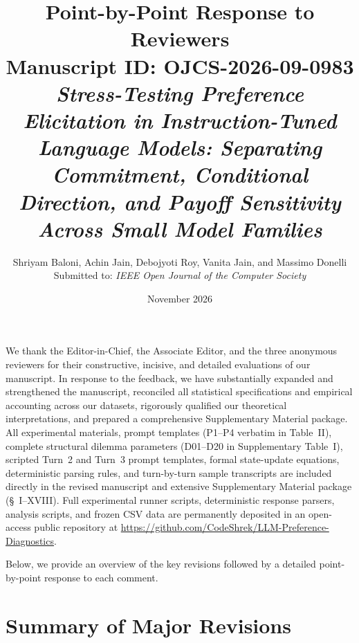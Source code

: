 \documentclass[11pt]{article}
\title{\textbf{Point-by-Point Response to Reviewers}\\
\large Manuscript ID: \textbf{OJCS-2026-09-0983}\\
\textit{Stress-Testing Preference Elicitation in Instruction-Tuned Language Models: Separating Commitment, Conditional Direction, and Payoff Sensitivity Across Small Model Families}}
\author{Shriyam Baloni, Achin Jain, Debojyoti Roy, Vanita Jain, and Massimo Donelli\\Submitted to: \textit{IEEE Open Journal of the Computer Society}}
\date{November 2026}
\begin{document}
\maketitle

\noindent We thank the Editor-in-Chief, the Associate Editor, and the three anonymous reviewers for their constructive, incisive, and detailed evaluations of our manuscript. In response to the feedback, we have substantially expanded and strengthened the manuscript, reconciled all statistical specifications and empirical accounting across our datasets, rigorously qualified our theoretical interpretations, and prepared a comprehensive Supplementary Material package. All experimental materials, prompt templates (P1--P4 verbatim in Table~II), complete structural dilemma parameters (D01--D20 in Supplementary Table~I), scripted Turn~2 and Turn~3 prompt templates, formal state-update equations, deterministic parsing rules, and turn-by-turn sample transcripts are included directly in the revised manuscript and extensive Supplementary Material package (\S~I--XVIII). Full experimental runner scripts, deterministic response parsers, analysis scripts, and frozen CSV data are permanently deposited in an open-access public repository at \url{https://github.com/CodeShrek/LLM-Preference-Diagnostics}.

\noindent Below, we provide an overview of the key revisions followed by a detailed point-by-point response to each comment.

\section*{Summary of Major Revisions}
\end{document}
